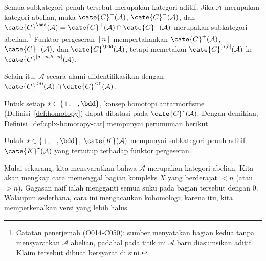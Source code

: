 Semua subkategori penuh tersebut merupakan kategori aditif. Jika
$\mathcal{A}$ merupakan kategori abelian, maka $\cate{C}^+(\mathcal{A})$,
$\cate{C}^-(\mathcal{A})$, dan
$\cate{C}^{\bdd}(\mathcal{A}) = \cate{C}^+(\mathcal{A}) \cap
\cate{C}^-(\mathcal{A})$ merupakan subkategori abelian.\footnote{Catatan
penerjemah (O014-C050): sumber menyatakan bagian kedua tanpa mensyaratkan
$\mathcal{A}$ abelian, padahal pada titik ini $\mathcal{A}$ baru diasumsikan
aditif. Klaim tersebut dibuat bersyarat di sini.} Funktor pergeseran
$[n]$ mempertahankan $\cate{C}^+(\mathcal{A})$,
$\cate{C}^-(\mathcal{A})$, dan $\cate{C}^{\bdd}(\mathcal{A})$, tetapi
memetakan $\cate{C}^{[a,b]}(\mathcal{A})$ ke
$\cate{C}^{[a-n, b-n]}(\mathcal{A})$.

Selain itu, $\mathcal{A}$ secara alami diidentifikasikan dengan
$\cate{C}^{\geq 0}(\mathcal{A}) \cap \cate{C}^{\leq 0}(\mathcal{A})$.

Untuk setiap $\star \in \{+, -, \bdd\}$, konsep homotopi antarmorfisme
(Definisi~\ref{def:homotopy}) dapat dibatasi pada
$\cate{C}^{\star}(\mathcal{A})$. Dengan demikian,
Definisi~\ref{def:cplx-homotopy-cat} mempunyai perumuman berikut.

\begin{definisi}\label{def:cplx-homotopy-cat-variant}
	Untuk $\star \in \{+, -, \bdd\}$, $\cate{K}(\mathcal{A})$ mempunyai
	subkategori penuh aditif $\cate{K}^\star(\mathcal{A})$ yang tertutup
	terhadap funktor pergeseran.
\end{definisi}

Mulai sekarang, kita mensyaratkan bahwa $\mathcal{A}$ merupakan kategori
abelian. Kita akan mengkaji cara memenggal bagian kompleks $X$ yang berderajat $< n$ (atau
$> n$). Gagasan naif ialah mengganti semua suku pada bagian tersebut dengan
$0$. Walaupun sederhana, cara ini mengacaukan kohomologi; karena itu, kita
memperkenalkan versi yang lebih halus.

